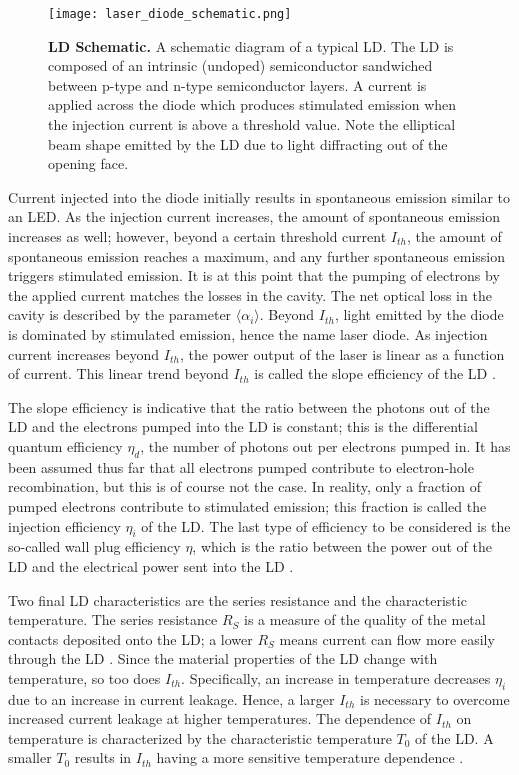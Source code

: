 \documentclass[9pt,twocolumn,twoside]{osajnl}
\begin{document}
\begin{figure}[H]
\centering
\texttt{[image: laser\_diode\_schematic.png]}
\caption{\textbf{LD Schematic.} A schematic diagram of a typical LD. The LD is composed of an intrinsic (undoped) semiconductor sandwiched between p-type and n-type semiconductor layers. A current is applied across the diode which produces stimulated emission when the injection current is above a threshold value. Note the elliptical beam shape emitted by the LD due to light diffracting out of the opening face.}
\label{fig:LD_schematic}
\end{figure}

Current injected into the diode initially results in spontaneous emission similar to an LED. As the injection current increases, the amount of spontaneous emission increases as well; however, beyond a certain threshold current $I_{th}$, the amount of spontaneous emission reaches a maximum, and any further spontaneous emission triggers stimulated emission. It is at this point that the pumping of electrons by the applied current matches the losses in the cavity. The net optical loss in the cavity is described by the parameter $\langle \alpha_i \rangle$. Beyond $I_{th}$, light emitted by the diode is dominated by stimulated emission, hence the name laser diode. As injection current increases beyond $I_{th}$, the power output of the laser is linear as a function of current. This linear trend beyond $I_{th}$ is called the slope efficiency of the LD \cite{Coldren}.

The slope efficiency is indicative that the ratio between the photons out of the LD and the electrons pumped into the LD is constant; this is the differential quantum efficiency $\eta_d$, the number of photons out per electrons pumped in. It has been assumed thus far that all electrons pumped contribute to electron-hole recombination, but this is of course not the case. In reality, only a fraction of pumped electrons contribute to stimulated emission; this fraction is called the injection efficiency $\eta_i$ of the LD. The last type of efficiency to be considered is the so-called wall plug efficiency $\eta$, which is the ratio between the power out of the LD and the electrical power sent into the LD \cite{Coldren}.

Two final LD characteristics are the series resistance and the characteristic temperature. The series resistance $R_S$ is a measure of the quality of the metal contacts deposited onto the LD; a lower $R_S$ means current can flow more easily through the LD \cite{Kamran}. Since the material properties of the LD change with temperature, so too does $I_{th}$. Specifically, an increase in temperature decreases $\eta_i$ due to an increase in current leakage. Hence, a larger $I_{th}$ is necessary to overcome increased current leakage at higher temperatures. The dependence of $I_{th}$ on temperature is characterized by the characteristic temperature $T_0$ of the LD. A smaller $T_0$ results in $I_{th}$ having a more sensitive temperature dependence \cite{Coldren}.
\end{document}
